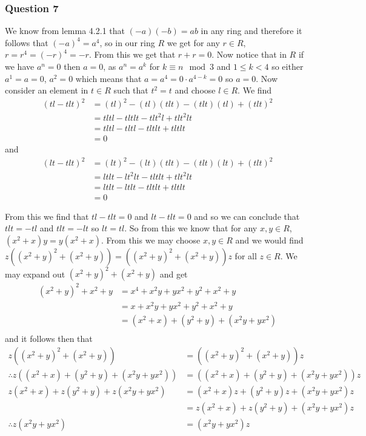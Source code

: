 \documentclass{article}
\begin{document}
\subsubsection{Question 7}
We know from lemma 4.2.1 that $(-a)(-b) = ab$ in any ring and therefore it follows that $(-a)^4 = a^4$, so in our ring $R$ we get for any $r\in R$, $r = r^4 = (-r)^4 = -r$. From this we get that $r + r = 0$. Now notice that in $R$ if we have $a^n = 0$ then $a = 0$, as $a^n = a^k$ for $k \equiv n\mod 3$ and $1 \le k < 4$ so either $a^1 = a = 0$, $a^2 = 0$ which means that $a = a^4 = 0\cdot a^{4-k} = 0$ so $a= 0$. Now consider an element in $t\in R$ such that $t^2 = t$ and choose $l\in R$. We find 
\begin{align*}
(tl - tlt)^2 &= (tl)^2 - (tl)(tlt) - (tlt)(tl) + (tlt)^2\\
&= tltl - tltlt - tlt^2l + tlt^2lt \\
&= tltl - tltl - tltlt + tltlt \\
&= 0
\end{align*} and \begin{align*}
(lt-tlt)^2 &= (lt)^2-(lt)(tlt)-(tlt)(lt) + (tlt)^2 \\
&= ltlt-lt^2lt-tltlt+tlt^2lt \\
&= ltlt-ltlt-tltlt+tltlt \\
&= 0
\end{align*}

From this we find that $tl-tlt = 0$ and $lt - tlt = 0$ and so we can conclude that $tlt = -tl$ and $tlt = -lt$ so $lt = tl$. So from this we know that for any $x,y\in R$, $(x^2+x)y = y(x^2+x)$. From this we may choose $x,y \in R$ and we would find $z((x^2+y)^2+(x^2+y))=((x^2+y)^2+(x^2+y))z$ for all $z\in R$. We may expand out $(x^2+y)^2+(x^2+y)$ and get\begin{align*}
(x^2+y)^2+x^2+y &= x^4+x^2y+yx^2+y^2+x^2+y \\
&= x+x^2y+yx^2+y^2+x^2+y \\
&= (x^2+x)+(y^2+y)+(x^2y+yx^2)\\
\end{align*}
and it follows then that
\begin{align*}
z((x^2+y)^2+(x^2+y))&=((x^2+y)^2+(x^2+y))z\\
\therefore z((x^2+x)+(y^2+y)+(x^2y+yx^2))&=((x^2+x)+(y^2+y)+(x^2y+yx^2))z\\
z(x^2+x) + z(y^2+y) + z(x^2y+yx^2) &= (x^2+x)z + (y^2+y)z + (x^2y+yx^2)z \\
&= z(x^2+x) + z(y^2+y) + (x^2y+yx^2)z\\
\therefore z(x^2y+yx^2)&=(x^2y+yx^2)z
\end{align*}
\end{document}
